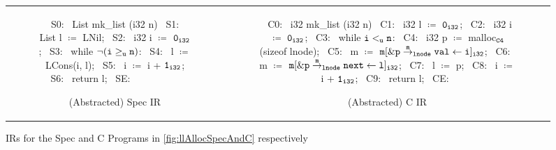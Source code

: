 \begin{figure}[H]
\begin{tabular}{cc}
\begin{subfigure}[b]{0.4\textwidth}
\begin{center}
\begin{allLangEnvScript}
~{\scriptsize \textcolor{mygray}{S0:}}~ List mk_list (i32 n) {
~{\scriptsize \textcolor{mygray}{S1:}}~   List l $\coloneqq$ LNil;
~{\scriptsize \textcolor{mygray}{S2:}}~   i32  i $\coloneqq$ ${\tt 0_{i32}}$;
~{\scriptsize \textcolor{mygray}{S3:}}~   while $\mathrm{\tt \neg (i \geq_{u} n)}$:
~{\scriptsize \textcolor{mygray}{S4:}}~     l $\coloneqq$ LCons(i, l);
~{\scriptsize \textcolor{mygray}{S5:}}~     i $\coloneqq$ i + ${\tt 1_{i32}}$;
~{\scriptsize \textcolor{mygray}{S6:}}~   return l;
~{\scriptsize \textcolor{mygray}{SE:}}~ }
~{\scriptsize \textcolor{mygray}{   }}~
~{\scriptsize \textcolor{mygray}{   }}~
~{\scriptsize \textcolor{mygray}{   }}~
\end{allLangEnvScript}
\end{center}
\vspace{-15px}
\caption{\label{fig:llAllocSpecIR}(Abstracted) Spec IR}
\end{subfigure}%
&
\begin{subfigure}[b]{0.6\textwidth}
\begin{center}
\begin{allLangEnvScript}
~{\scriptsize \textcolor{mygray}{C0:}}~ i32 mk_list (i32 n) {
~{\scriptsize \textcolor{mygray}{C1:}}~   i32 l $\coloneqq$ ${\tt 0_{i32}}$;
~{\scriptsize \textcolor{mygray}{C2:}}~   i32 i $\coloneqq$ ${\tt 0_{i32}}$;
~{\scriptsize \textcolor{mygray}{C3:}}~   while ${\tt i <_{u} n}$:
~{\scriptsize \textcolor{mygray}{C4:}}~     i32 p $\coloneqq$ malloc$_{\tt C4}$(sizeof lnode);
~{\scriptsize \textcolor{mygray}{C5:}}~     m $\coloneqq$ $\mathrm{\tt m[\&{\tt \tt p} \overset{m}{\rightarrow}_{\tt lnode} {\tt val} \leftarrow i]_{i32}}$;
~{\scriptsize \textcolor{mygray}{C6:}}~     m $\coloneqq$ $\mathrm{\tt m[\&{\tt \tt p} \overset{m}{\rightarrow}_{\tt lnode} {\tt next} \leftarrow l]_{i32}}$;
~{\scriptsize \textcolor{mygray}{C7:}}~     l $\coloneqq$ p;
~{\scriptsize \textcolor{mygray}{C8:}}~     i $\coloneqq$ i + ${\tt 1_{i32}}$;
~{\scriptsize \textcolor{mygray}{C9:}}~   return l;
~{\scriptsize \textcolor{mygray}{CE:}}~ }
\end{allLangEnvScript}
\end{center}
\vspace{-15px}
\caption{\label{fig:llAllocCIR}(Abstracted) C IR}
\end{subfigure}%
\\
\end{tabular}
\caption{\label{fig:llAllocSpecIRAndCIR}IRs for the Spec and C Programs in \cref{fig:llAllocSpecAndC} respectively}
\end{figure}
